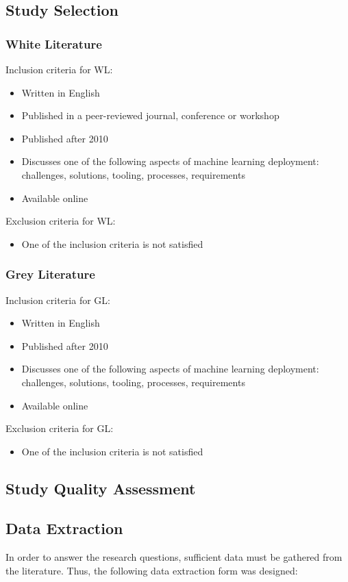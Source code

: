 \subsection{Study Selection}
\subsubsection{White Literature}
Inclusion criteria for WL:
\begin{itemize}
    \item Written in English
    \item Published in a peer-reviewed journal, conference or workshop
    \item Published after 2010
    \item Discusses one of the following aspects of machine learning deployment: challenges, solutions, tooling, processes, requirements
    \item Available online
\end{itemize}

Exclusion criteria for WL:
\begin{itemize}
    \item One of the inclusion criteria is not satisfied
\end{itemize}

\subsubsection{Grey Literature}
Inclusion criteria for GL:
\begin{itemize}
    \item Written in English
    \item Published after 2010
    \item Discusses one of the following aspects of machine learning deployment: challenges, solutions, tooling, processes, requirements
    \item Available online
\end{itemize}

Exclusion criteria for GL:
\begin{itemize}
    \item One of the inclusion criteria is not satisfied
\end{itemize}

\subsection{Study Quality Assessment}
\subsection{Data Extraction}
In order to answer the research questions, sufficient data must be gathered from the literature.
Thus, the following data extraction form was designed:

